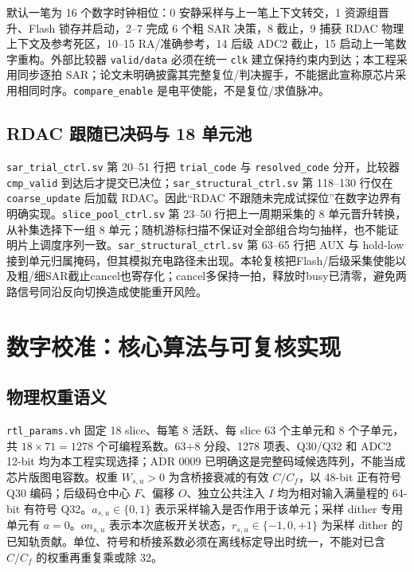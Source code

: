 \documentclass[UTF8,fontset=fandol,11pt,a4paper,openany]{ctexrep}
\newcommand{\code}[1]{\nolinkurl{#1}}
\begin{document}
默认一笔为 16 个数字时钟相位：0 安静采样与上一笔上下文转交，1 资源组晋升、Flash 锁存并启动，2--7 完成 6 个粗 SAR 决策，8 截止，9 捕获 RDAC 物理上下文及参考死区，10--15 RA/准确参考，14 后级 ADC2 截止，15 启动上一笔数字重构。外部比较器 \code{valid/data} 必须在统一 \code{clk} 建立保持约束内到达；本工程采用同步逐拍 SAR；论文未明确披露其完整复位/判决握手，不能据此宣称原芯片采用相同时序。\code{compare_enable} 是电平使能，不是复位/求值脉冲。

\section{RDAC 跟随已决码与 18 单元池}
\code{sar_trial_ctrl.sv} 第 20--51 行把 \code{trial_code} 与 \code{resolved_code} 分开，比较器 \code{cmp_valid} 到达后才提交已决位；\code{sar_structural_ctrl.sv} 第 118--130 行仅在 \code{coarse_update} 后加载 RDAC。因此“RDAC 不跟随未完成试探位”在数字边界有明确实现。\code{slice_pool_ctrl.sv} 第 23--50 行把上一周期采集的 8 单元晋升转换，从补集选择下一组 8 单元；随机游标扫描不保证对全部组合均匀抽样，也不能证明片上调度序列一致。\code{sar_structural_ctrl.sv} 第 63--65 行把 AUX 与 hold-low 接到单元归属掩码，但其模拟充电路径未出现。本轮复核把Flash/后级采集使能以及粗/细SAR截止cancel也寄存化；cancel多保持一拍，释放时busy已清零，避免两路信号同沿反向切换造成使能重开风险。



\chapter{数字校准：核心算法与可复核实现}
\section{物理权重语义}
\code{rtl_params.vh} 固定 18 slice、每笔 8 活跃、每 slice 63 个主单元和 8 个子单元，共 \(18\times71=1278\) 个可编程系数。63+8 分段、1278 项表、Q30/Q32 和 ADC2 12-bit 均为本工程实现选择；ADR 0009 已明确这是完整码域候选阵列，不能当成芯片版图电容数。权重 \(W_{s,u}>0\) 为含桥接衰减的有效 \(C/C_f\)，以 48-bit 正有符号 Q30 编码；后级码仓中心 \(F\)、偏移 \(O\)、独立公共注入 \(I\) 均为相对输入满量程的 64-bit 有符号 Q32。\(a_{s,u}\in\{0,1\}\) 表示采样输入是否作用于该单元；采样 dither 专用单元有 \(a=0\)。\(on_{s,u}\) 表示本次底板开关状态，\(r_{s,u}\in\{-1,0,+1\}\) 为采样 dither 的已知轨贡献。单位、符号和桥接系数必须在离线标定导出时统一，不能对已含 \(C/C_f\) 的权重再重复乘或除 32。
\end{document}
